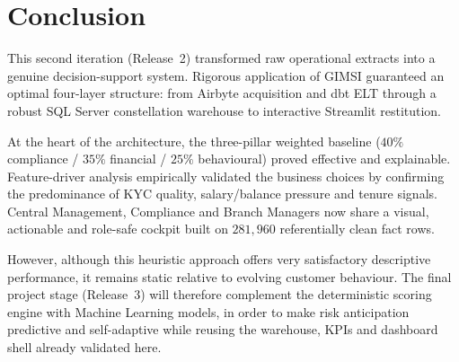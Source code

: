 \section{Conclusion}
\label{sec:release2_conclusion}
%
This second iteration (Release~2) transformed raw operational extracts into a
genuine decision-support system. Rigorous application of GIMSI guaranteed an
optimal four-layer structure: from Airbyte acquisition and dbt ELT through a
robust SQL Server constellation warehouse to interactive Streamlit restitution.

At the heart of the architecture, the three-pillar weighted baseline
($40\%$ compliance / $35\%$ financial / $25\%$ behavioural) proved effective and
explainable. Feature-driver analysis empirically validated the business choices by
confirming the predominance of KYC quality, salary/balance pressure and tenure
signals. Central Management, Compliance and Branch Managers now share a visual,
actionable and role-safe cockpit built on $281{,}960$ referentially clean fact
rows.

However, although this heuristic approach offers very satisfactory descriptive
performance, it remains static relative to evolving customer behaviour. The final
project stage (Release~3) will therefore complement the deterministic scoring
engine with Machine Learning models, in order to make risk anticipation
predictive and self-adaptive while reusing the warehouse, KPIs and dashboard
shell already validated here.
